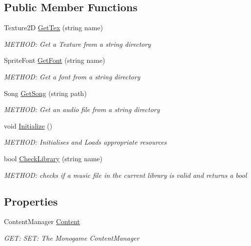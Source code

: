 \subsection*{Public Member Functions}
\begin{DoxyCompactItemize}
\item 
Texture2D \hyperlink{a00462_ad126b831364ad6219c3f25729c591597}{Get\+Tex} (string name)
\begin{DoxyCompactList}\small\item\em M\+E\+T\+H\+OD\+: Get a Texture from a string directory \end{DoxyCompactList}\item 
Sprite\+Font \hyperlink{a00462_abe9339a97b29bce2ba8a77504495f27d}{Get\+Font} (string name)
\begin{DoxyCompactList}\small\item\em M\+E\+T\+H\+OD\+: Get a font from a string directory \end{DoxyCompactList}\item 
Song \hyperlink{a00462_a6d962a64dc4f377bdb417598b17c53d0}{Get\+Song} (string path)
\begin{DoxyCompactList}\small\item\em M\+E\+T\+H\+OD\+: Get an audio file from a string directory \end{DoxyCompactList}\item 
void \hyperlink{a00462_ad861af436f861ea7d9c0966edfadac82}{Initialize} ()
\begin{DoxyCompactList}\small\item\em M\+E\+T\+H\+OD\+: Initialises and Loads appropriate resources \end{DoxyCompactList}\item 
bool \hyperlink{a00462_a08d51ffa3d65fd1122614e00a275cf48}{Check\+Library} (string name)
\begin{DoxyCompactList}\small\item\em M\+E\+T\+H\+OD\+: checks if a music file in the current library is valid and returns a bool \end{DoxyCompactList}\end{DoxyCompactItemize}
\subsection*{Properties}
\begin{DoxyCompactItemize}
\item 
Content\+Manager \hyperlink{a00462_a03b81447dfab7f3391b8f265dfd231c8}{Content}
\begin{DoxyCompactList}\small\item\em G\+ET\+: S\+ET\+: The Monogame Content\+Manager \end{DoxyCompactList}\end{DoxyCompactItemize}


